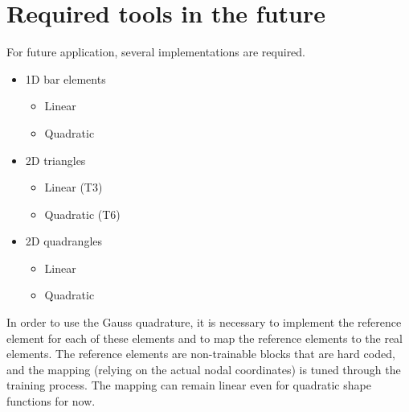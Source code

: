 \section{Required tools in the future}

For future application, several implementations are required. 
\begin{itemize}
    \item 1D bar elements 
    \begin{itemize}
        \item Linear
        \item Quadratic
    \end{itemize}
    \item 2D triangles
    \begin{itemize}
        \item Linear (T3)
        \item Quadratic (T6)
    \end{itemize}
    \item 2D quadrangles
    \begin{itemize}
        \item Linear
        \item Quadratic
    \end{itemize}
\end{itemize}

In order to use the Gauss quadrature, it is necessary to implement the reference element for each of these elements and to map the reference elements to the real elements. The reference elements are non-trainable blocks that are hard coded, and the mapping (relying on the actual nodal coordinates) is tuned through the training process. The mapping can remain linear even for quadratic shape functions for now.


